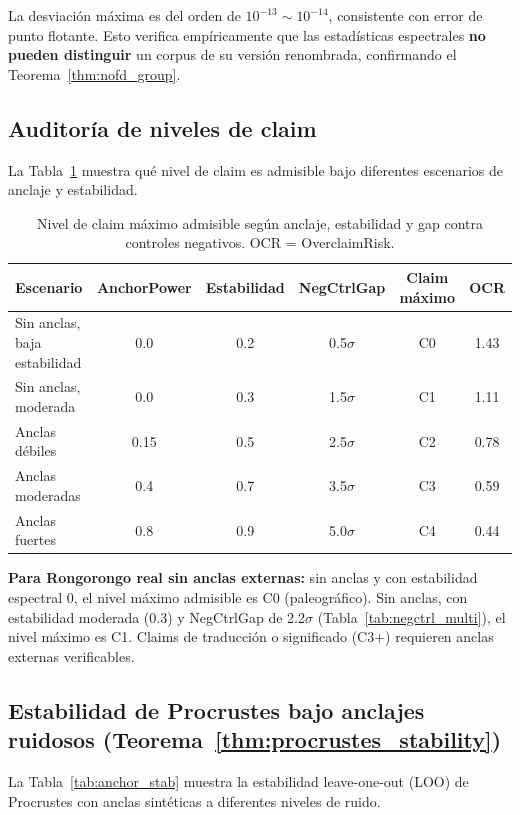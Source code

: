 \documentclass[11pt,a4paper]{article}
\newcommand{\1}{\mathbf{1}}
\numberwithin{equation}{section}
\begin{document}
La desviación máxima es del orden de $10^{-13} \sim 10^{-14}$, consistente con error de punto flotante. Esto verifica empíricamente que las estadísticas espectrales \textbf{no pueden distinguir} un corpus de su versión renombrada, confirmando el Teorema~\ref{thm:nofd_group}.

\subsection{Auditoría de niveles de claim}

La Tabla~\ref{tab:claims} muestra qué nivel de claim es admisible bajo diferentes escenarios de anclaje y estabilidad.

\begin{table}[h]
\centering
\caption{Nivel de claim máximo admisible según anclaje, estabilidad y gap contra controles negativos. OCR = OverclaimRisk.}
\label{tab:claims}
\begin{tabular}{lccccc}
\toprule
Escenario & AnchorPower & Estabilidad & NegCtrlGap & Claim máximo & OCR \\
\midrule
Sin anclas, baja estabilidad & 0.0 & 0.2 & 0.5$\sigma$ & C0 & 1.43 \\
Sin anclas, moderada & 0.0 & 0.3 & 1.5$\sigma$ & C1 & 1.11 \\
Anclas débiles & 0.15 & 0.5 & 2.5$\sigma$ & C2 & 0.78 \\
Anclas moderadas & 0.4 & 0.7 & 3.5$\sigma$ & C3 & 0.59 \\
Anclas fuertes & 0.8 & 0.9 & 5.0$\sigma$ & C4 & 0.44 \\
\bottomrule
\end{tabular}
\end{table}

\textbf{Para Rongorongo real sin anclas externas:} sin anclas y con estabilidad espectral 0, el nivel máximo admisible es C0 (paleográfico). Sin anclas, con estabilidad moderada (0.3) y NegCtrlGap de 2.2$\sigma$ (Tabla~\ref{tab:negctrl_multi}), el nivel máximo es C1. Claims de traducción o significado (C3+) requieren anclas externas verificables.

\subsection{Estabilidad de Procrustes bajo anclajes ruidosos (Teorema~\ref{thm:procrustes_stability})}

La Tabla~\ref{tab:anchor_stab} muestra la estabilidad leave-one-out (LOO) de Procrustes con anclas sintéticas a diferentes niveles de ruido.
\end{document}
